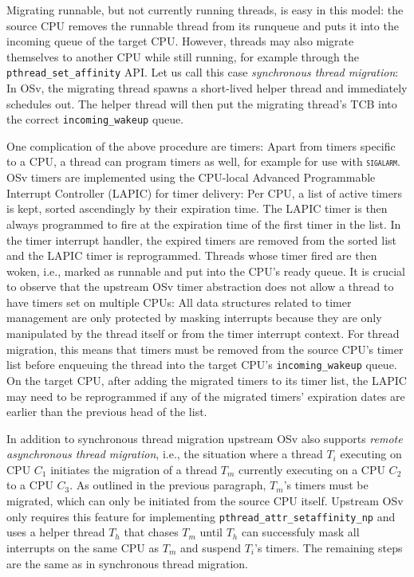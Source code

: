 \documentclass[12pt,a4paper]{book}
\begin{document}
Migrating runnable, but not currently running threads, is easy in this model:
the source CPU removes the runnable thread from its runqueue and puts it into the incoming queue of the target CPU.
However, threads may also migrate themselves to another CPU while still running, for example through the \lstinline[style=figurecpp]{pthread_set_affinity} API.
Let us call this case \emph{synchronous thread migration}:
In OSv, the migrating thread spawns a short-lived helper thread and immediately schedules out.
The helper thread will then put the migrating thread's TCB into the correct \lstinline[style=figurecpp]{incoming_wakeup} queue.~\cite{osvGit}

One complication of the above procedure are timers:
Apart from timers specific to a CPU, a thread can program timers as well, for example for use with \textsc{\texttt{sigalarm}}.
OSv timers are implemented using the CPU-local Advanced Programmable Interrupt Controller (LAPIC) for timer delivery:
Per CPU, a list of active timers is kept, sorted ascendingly by their expiration time.
The LAPIC timer is then always programmed to fire at the expiration time of the first timer in the list.
In the timer interrupt handler, the expired timers are removed from the sorted list and the LAPIC timer is reprogrammed.
Threads whose timer fired are then woken, i.e., marked as runnable and put into the CPU's ready queue.
It is crucial to observe that the upstream OSv timer abstraction does not allow a thread to have timers set on multiple CPUs:
All data structures related to timer management are only protected by masking interrupts because they are only manipulated by the thread itself or from the timer interrupt context.
For thread migration, this means that timers must be removed from the source CPU's timer list before enqueuing the thread into the target CPU's \lstinline[style=figurecpp]{incoming_wakeup} queue.
On the target CPU, after adding the migrated timers to its timer list, the LAPIC may need to be reprogrammed if any of the migrated timers' expiration dates are earlier than the previous head of the list.~\cite{osvGit}

In addition to synchronous thread migration upstream OSv also supports \emph{remote asynchronous thread migration}, i.e., the situation where a thread $T_i$ executing on CPU $C_1$ initiates the migration of a thread $T_m$ currently executing on a CPU $C_2$ to a CPU $C_3$.
As outlined in the previous paragraph, $T_m$'s timers must be migrated, which can only be initiated from the source CPU itself.
Upstream OSv only requires this feature for implementing \lstinline[style=figurecpp]{pthread_attr_setaffinity_np} and uses a helper thread $T_h$ that chases $T_m$ until $T_h$ can successfuly mask all interrupts on the same CPU as $T_m$ and suspend $T_i$'s timers.
The remaining steps are the same as in synchronous thread migration.~\cite{osvGit}
\end{document}
